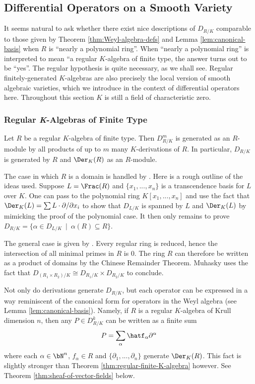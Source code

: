 \subsection{Differential Operators on a Smooth Variety}\label{sec:diff-op-examples}
It seems natural to ask whether there exist nice descriptions of $D_{R/K}$ comparable to those given by Theorem \ref{thm:Weyl-algebra-defs} and Lemma \ref{lem:canonical-basis} when $R$ is ``nearly a polynomial ring''. When ``nearly a polynomial ring'' is interpreted to mean ``a regular $K$-algebra of finite type, the answer turns out to be ``yes''. The regular hypothesis is quite necessary, as we shall see. Regular finitely-generated $K$-algebras are also precisely the local version of smooth algebraic varieties, which we introduce in the context of differential operators here. Throughout this section $K$ is still a field of characteristic zero.
\subsubsection{Regular \textit{K}-Algebras of Finite Type}

\begin{thm}\label{thm:regular-finite-K-algebra}
	Let $R$ be a regular $K$-algebra of finite type. Then $D^m_{R/K}$ is generated as an $R$-module by all products of up to $m$ many $K$-derivations of $R$. In particular, $D_{R/K}$ is generated by $R$ and $\Der_K(R)$ as an $R$-module.
\end{thm}
\begin{prf}
	The case in which $R$ is a domain is handled by \cite[Theorem 15.5.5]{mcconnell-robson}. Here is a rough outline of the ideas used. Suppose $L = \Frac(R)$ and $\{x_1,...,x_n\}$ is a transcendence basis for $L$ over $K$. One can pass to the polynomial ring $K[x_1,...,x_n]$ and use the fact that $\Der_K(L) = \sum L\cdot \partial/\partial x_i$ to show that $D_{L/K}$ is spanned by $L$ and $\Der_K(L)$ by mimicking the proof of the polynomial case. It then only remains to prove $D_{R/K} = \{\alpha \in D_{L/K} ~\mid~ \alpha(R) \subseteq R\}$.

	The general case is given by \cite[Theorem 1.15]{muhasky}. Every regular ring is reduced, hence the intersection of all minimal primes in $R$ is $0$. The ring $R$ can therefore be written as a product of domains by the Chinese Remainder Theorem. Muhasky uses the fact that $D_{(R_1\times R_2)/K} \cong D_{R_1/K} \times D_{R_2/K}$ to conclude.
\end{prf}
Not only do derivations generate $D_{R/K}$, but each operator can be expressed in a way reminiscent of the canonical form for operators in the Weyl algebra (see Lemma \ref{lem:canonical-basis}). Namely, if $R$ is a regular $K$-algebra of Krull dimension $n$, then any $P \in D^k_{R/K}$ can be written as a finite sum
\begin{align*}
	P = \sum_{\alpha} \hatf_\alpha \partial^\alpha
\end{align*}
where each $\alpha \in \bN^n$, $f_\alpha \in R$ and $\{\partial_1,...,\partial_n\}$ generate $\Der_{K}(R)$. This fact is slightly stronger than Theorem \ref{thm:regular-finite-K-algebra} however. See Theorem \ref{thm:sheaf-of-vector-fields} below.

